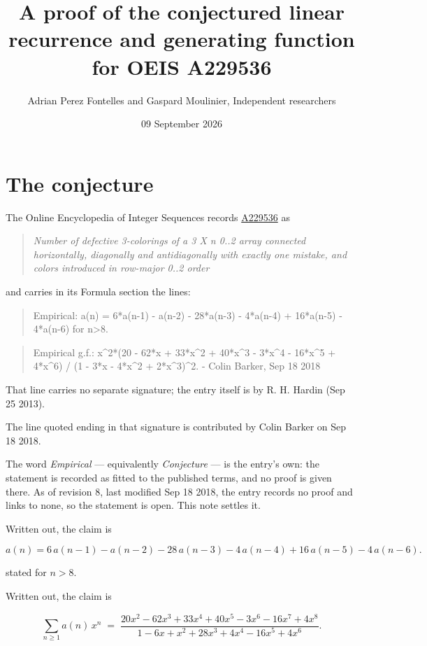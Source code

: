 \documentclass[11pt]{article}
\title{A proof of the conjectured linear recurrence and generating function for OEIS A229536}
\author{Adrian Perez Fontelles and Gaspard Moulinier, Independent researchers}
\date{09 September 2026}
\theoremstyle{definition}
\begin{document}
\maketitle
\section{The conjecture}

The Online Encyclopedia of Integer Sequences records \href{https://oeis.org/A229536}{A229536} as

\begin{quote}\itshape Number of defective 3-colorings of a 3 X n 0..2 array connected horizontally, diagonally and antidiagonally with exactly one mistake, and colors introduced in row-major 0..2 order\end{quote}

and carries in its Formula section the lines:

\begin{quote}\ttfamily Empirical: a(n) = 6*a(n-1) - a(n-2) - 28*a(n-3) - 4*a(n-4) + 16*a(n-5) - 4*a(n-6) for n>8.\end{quote}

\begin{quote}\ttfamily Empirical g.f.: x\textasciicircum{}2*(20 - 62*x + 33*x\textasciicircum{}2 + 40*x\textasciicircum{}3 - 3*x\textasciicircum{}4 - 16*x\textasciicircum{}5 + 4*x\textasciicircum{}6) / (1 - 3*x - 4*x\textasciicircum{}2 + 2*x\textasciicircum{}3)\textasciicircum{}2. - Colin Barker, Sep 18 2018\end{quote}

That line carries no separate signature; the entry itself is by R. H. Hardin (Sep 25 2013).

The line quoted ending in that signature is contributed by Colin Barker on Sep 18 2018.

The word {\itshape Empirical} --- equivalently {\itshape Conjecture} --- is the entry's own: the statement is recorded as fitted to the published terms, and no proof is given there. As of revision 8, last modified Sep 18 2018, the entry records no proof and links to none, so the statement is open. This note settles it.

Written out, the claim is

\[a(n) = 6\,a(n-1) - a(n-2) - 28\,a(n-3) - 4\,a(n-4) + 16\,a(n-5) - 4\,a(n-6).\]

stated for $n > 8$.

Written out, the claim is

\[\sum_{n \ge 1} a(n)\,x^n \;=\; \frac{20x^{2} - 62x^{3} + 33x^{4} + 40x^{5} - 3x^{6} - 16x^{7} + 4x^{8}}{1 - 6x + x^{2} + 28x^{3} + 4x^{4} - 16x^{5} + 4x^{6}}.\]
\end{document}
